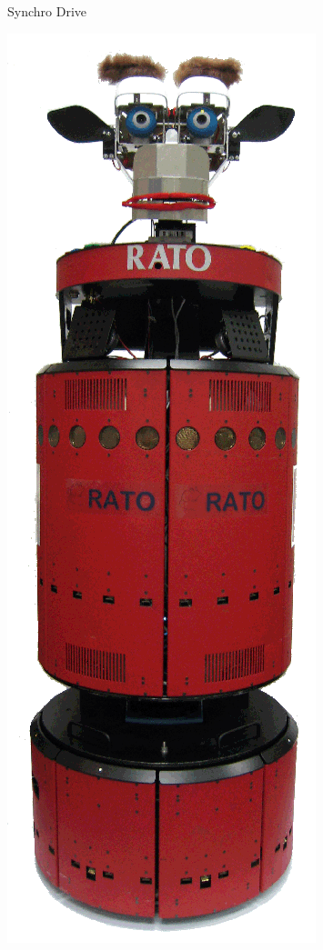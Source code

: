 \documentclass[compress]{beamer}
\begin{document}
\begin{frame}{Synchro Drive}
\begin{center}
        \includegraphics[height=0.4\paperheight]{b21}
    \end{center}

\end{frame}
\end{document}
